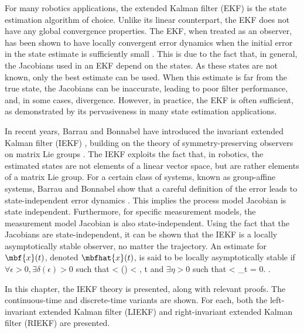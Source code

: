 
For many robotics applications, the extended Kalman filter (EKF) is the state estimation algorithm of choice. Unlike its linear counterpart, the EKF does not have any global convergence properties. The EKF, when treated as an observer, has been shown to have locally convergent error dynamics when the initial error in the state estimate is sufficiently  small \cite{Song1992,Krener2003}. This is due to the fact that, in general, the Jacobians used in an EKF depend on the states. As these states are not known, only the best estimate can be used. When this estimate is far from the true state, the Jacobians can be inaccurate, leading to poor filter performance, and, in some cases, divergence. However, in practice, the EKF is often sufficient, as demonstrated by its pervasiveness in many state estimation applications. 

In recent years, Barrau and Bonnabel have introduced the invariant extended Kalman filter (IEKF) \cite{Barrau2017}, building on the theory of symmetry-preserving observers on matrix Lie groups \cite{Bonnabel2008,Bonnabel2009}. The IEKF exploits the fact that, in robotics, the estimated states are not elements of a linear vector space, but are rather elements of a matrix Lie group. For a certain class of systems, known as group-affine systems, Barrau and Bonnabel show that a careful definition of the error leads to state-independent error dynamics \cite{Barrau2017}. This implies the process model Jacobian is state independent. Furthermore, for specific measurement models, the measurement model Jacobian is also state-independent. Using the fact that the Jacobians are state-independent, it can be shown that the IEKF is a locally asymptotically stable observer, no matter the trajectory. An estimate for $\mbf{x}(t)$, denoted $\mbfhat{x}(t)$, is said to be locally asymptotically stable if $\forall \epsilon > 0, \exists \delta(\epsilon) > 0$ such that 
\bdis
	 <  \delta(\epsilon) \implies {} < \epsilon, \forall t 
\edis and $\exists \eta > 0$ such that 
\bdis
	 < \eta \implies \lim_{t \to \infty}  = 0.
\edis.

In this chapter, the IEKF theory is presented, along with relevant proofs. The continuous-time \cite{Barrau2017} and discrete-time \cite{Barrau2018} variants are shown.  For each, both the left-invariant extended Kalman filter (LIEKF) and right-invariant extended Kalman filter (RIEKF) are presented.

